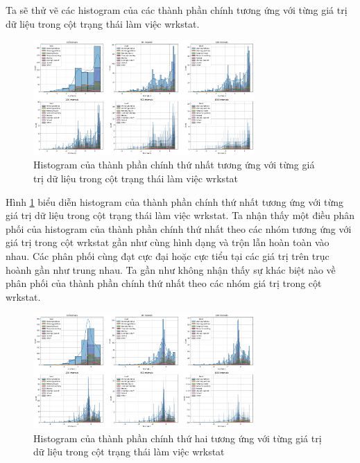 Ta sẽ thử vẽ các histogram của các thành phần chính tương ứng với từng giá trị dữ liệu trong cột trạng thái làm việc wrkstat.

\begin{figure}[H]
    \centering
    \includegraphics[width=0.75\textwidth]{figures/Thanh/Data_Analysis/Non_null_histogram_PCA_feature_0_vs_wrkstat_labels.png}
    \caption{Histogram của thành phần chính thứ nhất tương ứng với từng giá trị dữ liệu trong cột trạng thái làm việc wrkstat}
    \label{fig:Non_null_histogram_PCA_feature_0_vs_wrkstat_labels}
\end{figure}

Hình \ref{fig:Non_null_histogram_PCA_feature_0_vs_wrkstat_labels} biểu diễn histogram của thành phần chính thứ nhất tương ứng với từng giá trị dữ liệu trong cột trạng thái làm việc wrkstat.
Ta nhận thấy một điều phân phối của histogram của thành phần chính thứ nhất theo các nhóm tương ứng với giá trị trong cột wrkstat gần như cùng hình dạng và trộn lẫn hoàn toàn vào nhau.
Các phân phối cùng đạt cực đại hoặc cực tiểu tại các giá trị trên trục hoành gần như trung nhau.
Ta gần như không nhận thấy sự khác biệt nào về phân phối của thành phần chính thứ nhất theo các nhóm giá trị trong cột wrkstat.

\begin{figure}[H]
    \centering
    \includegraphics[width=0.75\textwidth]{figures/Thanh/Data_Analysis/Non_null_histogram_PCA_feature_1_vs_wrkstat_labels.png}
    \caption{Histogram của thành phần chính thứ hai tương ứng với từng giá trị dữ liệu trong cột trạng thái làm việc wrkstat}
    \label{fig:Non_null_histogram_PCA_feature_1_vs_wrkstat_labels}
\end{figure}

